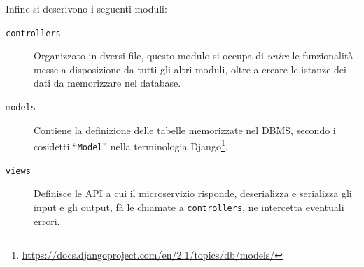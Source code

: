 Infine si descrivono i seguenti moduli:
\begin{description}
	\item[\texttt{controllers}]Organizzato in dversi file, questo modulo si occupa di
	\textit{unire} le funzionalità messe a disposizione da tutti gli altri moduli,
	oltre a creare le istanze dei dati da memorizzare nel database.
	\item[\texttt{models}]Contiene la definizione delle tabelle memorizzate nel DBMS, secondo
	i cosidetti ``\texttt{Model}'' nella terminologia
	Django\footnote{\url{https://docs.djangoproject.com/en/2.1/topics/db/models/}}.
	\item[\texttt{views}]Definisce le API a cui il microservizio risponde, deserializza e serializza
	gli input e gli output, fà le chiamate a \texttt{controllers}, ne intercetta eventuali errori.
\end{description}